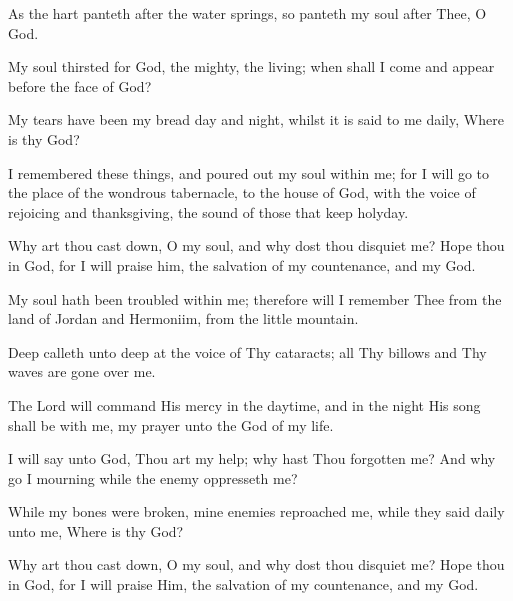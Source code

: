 As the hart panteth after the water springs, so panteth my soul after Thee, O God.

My soul thirsted for God, the mighty, the living; when shall I come and appear before the face of God?

My tears have been my bread day and night, whilst it is said to me daily, Where is thy God?

I remembered these things, and poured out my soul within me; for I will go to the place of the wondrous tabernacle, to the house of God, with the voice of rejoicing and thanksgiving, the sound of those that keep holyday.

Why art thou cast down, O my soul, and why dost thou disquiet me? Hope thou in God, for I will praise him, the salvation of my countenance, and my God.

My soul hath been troubled within me; therefore will I remember Thee from the land of Jordan and Hermoniim, from the little mountain.

Deep calleth unto deep at the voice of Thy cataracts; all Thy billows and Thy waves are gone over me.

The Lord will command His mercy in the daytime, and in the night His song shall be with me, my prayer unto the God of my life.

I will say unto God, Thou art my help; why hast Thou forgotten me? And why go I mourning while the enemy oppresseth me?

While my bones were broken, mine enemies reproached me, while they said daily unto me, Where is thy God?

Why art thou cast down, O my soul, and why dost thou disquiet me? Hope thou in God, for I will praise Him, the salvation of my countenance, and my God.
